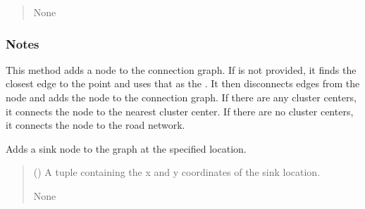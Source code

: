 \documentclass[letterpaper,10pt,english]{sphinxmanual}
\begin{document}
\begin{fulllineitems}
\begin{fulllineitems}
\begin{quote}
\begin{description}
\sphinxAtStartPar
None

\end{description}\end{quote}
\subsubsection*{Notes}

\sphinxAtStartPar
This method adds a node to the connection graph. If  is not provided, it finds the closest edge to
the point and uses that as the . It then disconnects edges from the node and adds the node to the
connection graph. If there are any cluster centers, it connects the node to the nearest cluster center. If there
are no cluster centers, it connects the node to the road network.

\end{fulllineitems}


\begin{fulllineitems}
\label{\detokenize{pysewer:pysewer.preprocessing.ModelDomain.add_sink}}
\pysigstartsignatures
{}
\pysigstopsignatures
\sphinxAtStartPar
Adds a sink node to the graph at the specified location.
\begin{quote}\begin{description}
\sphinxAtStartPar
{} () \textendash{} A tuple containing the x and y coordinates of the sink location.

\sphinxAtStartPar
None

\end{description}\end{quote}

\end{fulllineitems}



\end{fulllineitems}
\end{document}
